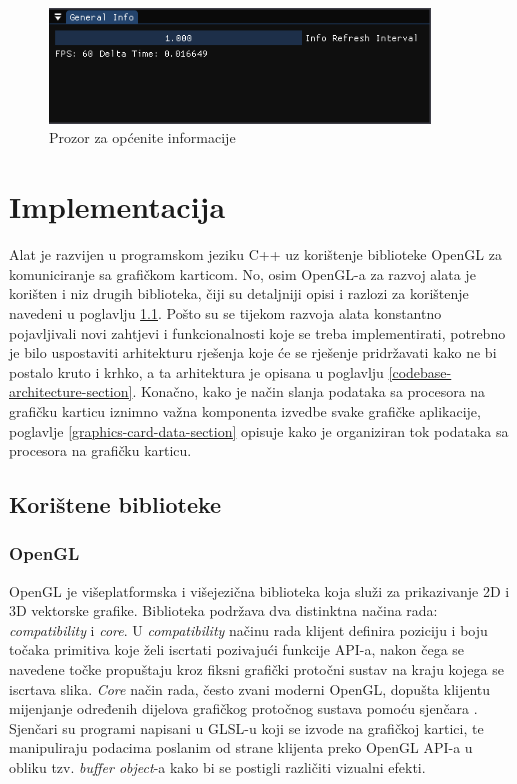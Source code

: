 \documentclass[times, utf8, diplomski]{fer}
\begin{document}
\begin{figure} [H]
	\centering
    \includegraphics[width=0.9\textwidth]{general_info.png}
    \caption{Prozor za općenite informacije\\}
    \label{fig:general-info}
\end{figure}

\chapter{Implementacija}

Alat je razvijen u programskom jeziku C++ uz korištenje biblioteke OpenGL za komuniciranje sa grafičkom karticom. No, osim OpenGL-a za razvoj alata je korišten i niz drugih biblioteka, čiji su detaljniji opisi i razlozi za korištenje navedeni u poglavlju \ref{libraries-section}. Pošto su se tijekom razvoja alata konstantno pojavljivali novi zahtjevi i funkcionalnosti koje se treba implementirati, potrebno je bilo uspostaviti arhitekturu rješenja koje će se rješenje pridržavati kako ne bi postalo kruto i krhko, a ta arhitektura je opisana u poglavlju \ref{codebase-architecture-section}. Konačno, kako je način slanja podataka sa procesora na grafičku karticu iznimno važna komponenta izvedbe svake grafičke aplikacije, poglavlje \ref{graphics-card-data-section} opisuje kako je organiziran tok podataka sa procesora na grafičku karticu.

\section{Korištene biblioteke} \label{libraries-section}

\subsection{OpenGL}

OpenGL\citep{opengl} je višeplatformska i višejezična biblioteka koja služi za prikazivanje 2D i 3D vektorske grafike. Biblioteka podržava dva distinktna načina rada: \textit{compatibility} i \textit{core}. U \textit{compatibility} načinu rada klijent definira poziciju i boju točaka primitiva koje želi iscrtati pozivajući funkcije API-a, nakon čega se navedene točke propuštaju kroz fiksni grafički protočni sustav na kraju kojega se iscrtava slika. \textit{Core} način rada, često zvani moderni OpenGL, dopušta klijentu mijenjanje određenih dijelova grafičkog protočnog sustava pomoću sjenčara . Sjenčari su programi napisani u GLSL-u  koji se izvode na grafičkoj kartici, te manipuliraju podacima poslanim od strane klijenta preko OpenGL API-a u obliku tzv. \textit{buffer object}-a kako bi se postigli različiti vizualni efekti.\\
\end{document}
